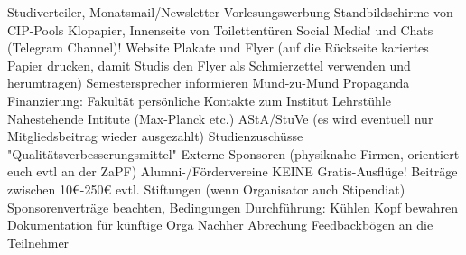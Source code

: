 \begin{outline}
          \2 Studiverteiler, Monatsmail/Newsletter
          \2 Vorlesungswerbung
          \2 Standbildschirme von CIP-Pools
          \2 Klopapier, Innenseite von Toilettentüren
          \2 Social Media! und Chats (Telegram Channel)!
          \2 Website
          \2 Plakate und Flyer (auf die Rückseite kariertes Papier drucken, damit Studis den Flyer als Schmierzettel verwenden und herumtragen)
          \2 Semestersprecher informieren
          \2 Mund-zu-Mund Propaganda
        \1 Finanzierung:
          \2 Fakultät
          \2 persönliche Kontakte zum Institut
          \2 Lehrstühle
          \2 Nahestehende Intitute (Max-Planck etc.)
          \2 AStA/StuVe (es wird eventuell nur Mitgliedsbeitrag wieder ausgezahlt)
          \2 Studienzuschüsse
          \2 "Qualitätsverbesserungsmittel"
          \2 Externe Sponsoren (physiknahe Firmen, orientiert euch evtl an der ZaPF)
          \2 Alumni-/Fördervereine
          \2 KEINE Gratis-Ausflüge! Beiträge zwischen 10€-250€
          \2 evtl. Stiftungen (wenn Organisator auch Stipendiat)
          \2 Sponsorenverträge beachten, Bedingungen
        \1 Durchführung:
          \2 Kühlen Kopf bewahren
          \2 Dokumentation für künftige Orga
          \2 Nachher Abrechung
          \2 Feedbackbögen an die Teilnehmer
      \end{outline}
